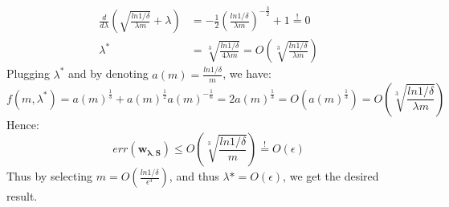 \begin{equation*}
    \begin{split}        
        \frac{d}{d\lambda} \left(\sqrt{\frac{ln 1/\delta}{\lambda m}} + \lambda\right) &= -\frac{1}{2} (\frac{ln 1/\delta}{\lambda m})^{-\frac{3}{2}} + 1 \overset{!}{=} 0 \\
        \lambda^* &= \sqrt[3]{\frac{ln 1/\delta}{4\lambda m}} = O(\sqrt[3]{\frac{ln 1/\delta}{\lambda m}})
    \end{split}
\end{equation*}
Plugging $\lambda^*$ and by denoting $a(m) = \frac{ln 1/\delta}{m}$, we have:
\begin{equation*}
    f(m, \lambda^*) = a(m)^\frac{1}{3} + a(m)^\frac{1}{2} a(m)^{-\frac{1}{6}} = 2a(m)^\frac{1}{3} = O(a(m)^\frac{1}{3}) = O(\sqrt[3]{\frac{ln 1/\delta}{\lambda m}})
\end{equation*}
Hence:
\begin{equation*}
    err(\boldsymbol{w_{\lambda, S}}) \leq O(\sqrt[3]{\frac{ln 1/\delta}{m}}) \overset{!}{=} O(\epsilon)
\end{equation*}
Thus by selecting $m = O\left(\frac{ln 1/\delta}{\epsilon^3}\right)$, and thus $\lambda* = O(\epsilon)$, we get the desired result.